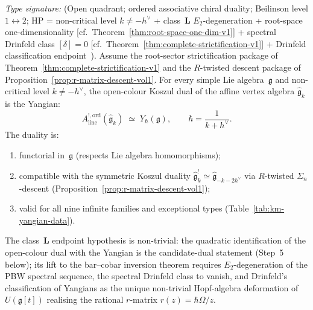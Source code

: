 \begin{theorem}
\label{thm:km-yangian}
\emph{Type signature:} (Open quadrant; ordered associative
chiral duality; Beilinson level $1\!\leftrightarrow\!2$; HP =
non-critical level $k\neq -h^\vee$ + class~$\mathbf L$
$E_2$-degeneration + root-space one-dimensionality
[\textup{cf.}~Theorem~\textup{\ref{thm:root-space-one-dim-v1}}] +
spectral Drinfeld class $[\delta] = 0$
[\textup{cf.}~Theorem~\textup{\ref{thm:complete-strictification-v1}}]
+ Drinfeld classification endpoint~\cite{Drinfeld88}).
Assume the root-sector strictification package of
Theorem~\textup{\ref{thm:complete-strictification-v1}} and the
$R$-twisted descent package of
Proposition~\textup{\ref{prop:r-matrix-descent-vol1}}.
For every simple Lie algebra~$\mathfrak{g}$ and non-critical
level $k\neq -h^\vee$, the open-colour Koszul dual of the
affine vertex algebra $\widehat{\mathfrak{g}}_k$ is the
Yangian:
\begin{equation}\label{eq:km-yangian-duality}
A^{!,\mathrm{ord}}_{\mathrm{line}}
(\widehat{\mathfrak{g}}_k)
\;\simeq\;
Y_\hbar(\mathfrak{g}),
\qquad
\hbar = \frac{1}{k+h^\vee}.
\end{equation}
The duality is:
\begin{enumerate}[label=\textup{(\arabic*)}]
\item functorial in~$\mathfrak{g}$
\textup{(}respects Lie algebra homomorphisms\textup{)};

\item compatible with the symmetric Koszul duality
$\widehat{\mathfrak{g}}_k^!\simeq
\widehat{\mathfrak{g}}_{-k-2h^\vee}$
via $R$-twisted $\Sigma_n$-descent
\textup{(}Proposition~\textup{\ref{prop:r-matrix-descent-vol1})};

\item valid for all nine infinite families and
exceptional types \textup{(}Table~\textup{\ref{tab:km-yangian-data})}.
\end{enumerate}
The class~$\mathbf L$ endpoint hypothesis is non-trivial: the
quadratic identification of the open-colour dual with the Yangian
is the candidate-dual statement \textup{(}Step~5 below\textup{)};
its lift to the bar--cobar inversion theorem requires
$E_2$-degeneration of the PBW spectral sequence, the spectral
Drinfeld class to vanish, and Drinfeld's classification of Yangians
as the unique non-trivial Hopf-algebra deformation of $U(\mathfrak{g}[t])$
realising the rational $r$-matrix $r(z) = \hbar\Omega/z$.
\end{theorem}

